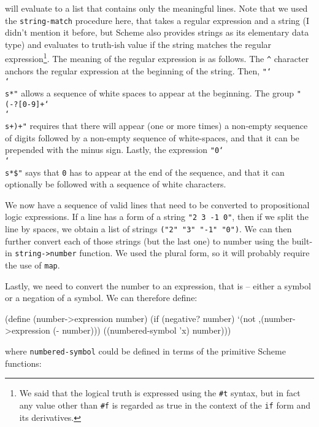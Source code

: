 will evaluate to a list that contains only the meaningful
lines. Note that we used the \texttt{string-match} procedure
here, that takes a regular expression and a string (I
didn't mention it before, but Scheme also provides strings as
its elementary data type) and evaluates to truth-ish value
if the string matches the regular expression\footnote{
We said that the logical truth is expressed using the
\texttt{\#t} syntax, but in fact any value other than
\texttt{\#f} is regarded as true in the context of the
\texttt{if} form and its derivatives.}. The meaning
of the regular expression is as follows. The \texttt{\string^}
character anchors the regular expression at the beginning
of the string. Then, \texttt{"\char`\\\char`\\s*"} allows a sequence
of white spaces to appear at the beginning. The group
\texttt{"(-?[0-9]+\char`\\\char`\\s+)+"} requires that there
will appear (one or more times) a non-empty sequence of digits followed
by a non-empty sequence of white-spaces, and that it can be
prepended with the minus sign. Lastly, the expression
\texttt{"0\char`\\\char`\\s*\$"} says that \texttt{0} has to appear
at the end of the sequence, and that it can optionally be
followed with a sequence of white characters.

We now have a sequence of valid lines that need to be
converted to propositional logic expressions. If a line has
a form of a string \texttt{"2 3 -1 0"}, then if we split
the line by spaces, we obtain a list of strings
\texttt{("2" "3" "-1" "0")}. We can then further
convert each of those strings (but the last one) to number
using the built-in \texttt{string->number} function. We used
the plural form, so it will probably require the use
of \texttt{map}.

Lastly, we need to convert the number to an expression,
that is -- either a symbol or a negation of a symbol.
We can therefore define:

\begin{Snippet}
(define (number->expression number)
  (if (negative? number)
    `(not ,(number->expression (- number)))
     ((numbered-symbol 'x) number)))
\end{Snippet}

where \texttt{numbered-symbol} could be defined in
terms of the primitive Scheme functions:

